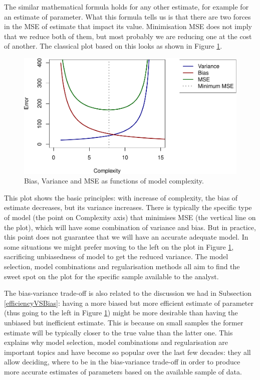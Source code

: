 \documentclass[
]{book}
\theoremstyle{definition}
\theoremstyle{definition}
\theoremstyle{definition}
\theoremstyle{definition}
\theoremstyle{remark}
\begin{document}
The similar mathematical formula holds for any other estimate, for example for an estimate of parameter. What this formula tells us is that there are two forces in the MSE of estimate that impact its value. Minimisation MSE does not imply that we reduce both of them, but most probably we are reducing one at the cost of another. The classical plot based on this looks as shown in Figure \ref{fig:biasVarianceMSE}.

\begin{figure}
\centering
\includegraphics{Svetunkov---Statistics-for-Business-Analytics_files/figure-latex/biasVarianceMSE-1.pdf}
\caption{\label{fig:biasVarianceMSE}Bias, Variance and MSE as functions of model complexity.}
\end{figure}

This plot shows the basic principles: with increase of complexity, the bias of estimate decreases, but its variance increases. There is typically the specific type of model (the point on Complexity axis) that minimises MSE (the vertical line on the plot), which will have some combination of variance and bias. But in practice, this point does not guarantee that we will have an accurate adequate model. In some situations we might prefer moving to the left on the plot in Figure \ref{fig:biasVarianceMSE}, sacrificing unbiasedness of model to get the reduced variance. The model selection, model combinations and regularisation methods all aim to find the sweet spot on the plot for the specific sample available to the analyst.

The bias-variance trade-off is also related to the discussion we had in Subsection \ref{efficiencyVSBias}: having a more biased but more efficient estimate of parameter (thus going to the left in Figure \ref{fig:biasVarianceMSE}) might be more desirable than having the unbiased but inefficient estimate. This is because on small samples the former estimate will be typically closer to the true value than the latter one. This explains why model selection, model combinations and regularisation are important topics and have become so popular over the last few decades: they all allow deciding, where to be in the bias-variance trade-off in order to produce more accurate estimates of parameters based on the available sample of data.

  
\end{document}

